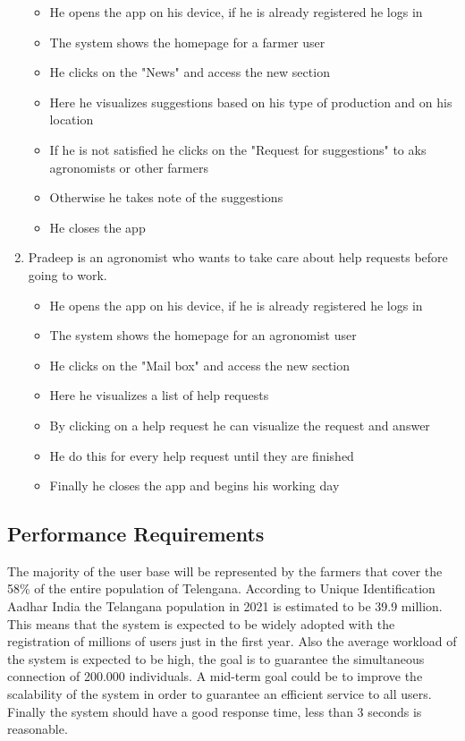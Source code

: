 \documentclass[table, 12pt]{article}
\begin{document}
\begin{enumerate}
    \begin{itemize}
        \item He opens the app on his device, if he is already registered he logs in
        \item The system shows the homepage for a farmer user
        \item He clicks on the "News" and access the new section
        \item Here he visualizes suggestions based on his type of production and on his location
        \item If he is not satisfied he clicks on the "Request for suggestions" to aks agronomists or other farmers
        \item Otherwise he takes note of the suggestions
        \item He closes the app
    \end{itemize}
    \item Pradeep is an agronomist who wants to take care about help requests before going to work.
    \begin{itemize}
        \item He opens the app on his device, if he is already registered he logs in
        \item The system shows the homepage for an agronomist user
        \item He clicks on the "Mail box" and access the new section
        \item Here he visualizes a list of help requests
        \item By clicking on a help request he can visualize the request and answer 
        \item He do this for every help request until they are finished
        \item Finally he closes the app and begins his working day
    \end{itemize} 
\end{enumerate}
\subsection{Performance Requirements}
The majority of the user base will be represented by the farmers that cover the 58\% of the entire population of Telengana.
According to Unique Identification Aadhar India the Telangana population in 2021 is estimated to be 39.9 million.
This means that the system is expected to be widely adopted with the registration of millions of users just in the first year.
Also the average workload of the system is expected to be high, the goal is to guarantee the simultaneous connection of 200.000 individuals.
A mid-term goal could be to improve the scalability of the system in order to guarantee an efficient service to all users.
Finally the system should have a good response time, less than 3 seconds is reasonable.
\end{document}
